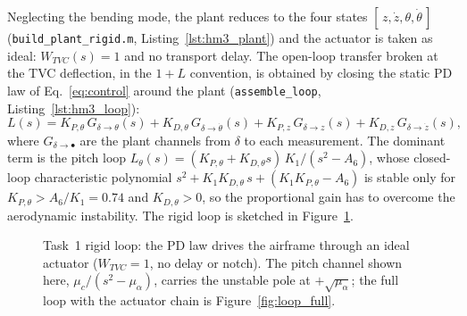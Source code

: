 \documentclass[../main.tex]{subfiles}
\begin{document}
Neglecting the bending mode, the plant reduces to the four states
$[\,z,\dot z,\theta,\dot\theta\,]$ (\texttt{build\_plant\_rigid.m}, Listing~\ref{lst:hm3_plant}) and the actuator is taken as ideal:
$W_{TVC}(s)=1$ and no transport delay. The open-loop transfer broken at the TVC
deflection, in the $1+L$ convention, is obtained by closing the static
PD law of Eq.~\eqref{eq:control} around the plant (\texttt{assemble\_loop}, Listing~\ref{lst:hm3_loop}):
\begin{equation}
L(s) = K_{P,\theta}\,G_{\delta\to\theta}(s)
     + K_{D,\theta}\,G_{\delta\to\dot\theta}(s)
     + K_{P,z}\,G_{\delta\to z}(s)
     + K_{D,z}\,G_{\delta\to\dot z}(s),
\end{equation}
where $G_{\delta\to\bullet}$ are the plant channels from $\delta$ to each
measurement. The dominant term is the pitch loop
$L_\theta(s) = (K_{P,\theta}+K_{D,\theta}s)\,K_1/(s^2-A_6)$, whose closed-loop
characteristic polynomial $s^2 + K_1 K_{D,\theta}\,s + (K_1 K_{P,\theta}-A_6)$
is stable only for $K_{P,\theta} > A_6/K_1 = 0.74$ and $K_{D,\theta} > 0$, so the
proportional gain has to overcome the aerodynamic instability. The rigid loop is
sketched in Figure~\ref{fig:loop_rigid}.

\begin{figure}[H]
\centering
{}
\caption{Task~1 rigid loop: the PD law drives the airframe through an ideal
actuator ($W_{TVC}=1$, no delay or notch). The pitch channel shown here,
$\mu_c/(s^2-\mu_\alpha)$, carries the unstable pole at $+\sqrt{\mu_\alpha}$; the
full loop with the actuator chain is Figure~\ref{fig:loop_full}.}
\label{fig:loop_rigid}
\end{figure}
\end{document}
